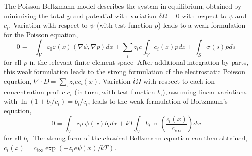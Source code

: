 The Poisson-Boltzmann model describes the system in equilibrium,
obtained by minimising the total grand potential with variation
$\delta\Omega=0$ with respect to $\psi$ and $c_i$. Variation with
respect to $\psi$ (with test function $p$) leads to a weak formulation
for the Poisson equation,
\begin{equation}
    0 = -\int_{V} \varepsilon_{0}\varepsilon(x) (\nabla\psi,\nabla p) dx + \sum_{i}z_i e \int_{V} c_{i}(x) p dx + \int_{S} \sigma(s) p ds  
    \label{weak_Poisson}
\end{equation}
for all $p$ in the relevant finite element space.  After additional
integration by parts, this weak formulation leads to the strong
formulation of the electrostatic Poisson equation,
$\nabla\cdot D = \sum_i z_i e c_{i}(x)$. Variation $\delta\Omega$ with
respect to each ion concentration profile $c_i$ (in turn, with test
function $b_i$), assuming linear variations with
$\ln(1+b_i/c_i)=b_i/c_i$, leads to the weak formulation of Boltzmann's
equation,
\begin{equation}
    0 = \int_{V}z_i e \psi(x) b_i dx
    + kT \int_{V} b_i \ln\left(\frac{c_i(x)}{c_{i\infty}}\right)dx
    \label{weak_Boltzmann}
\end{equation}
for all $b_i$. The strong form of the classical Boltzmann equation can then obtained, $c_i(x)=c_{i\infty}\exp(-z_i e \psi(x)/kT)$. 

